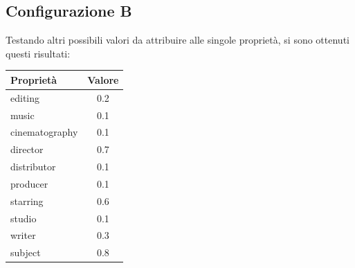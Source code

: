 \subsection{Configurazione B}
Testando altri possibili valori da attribuire alle singole proprietà, si sono ottenuti questi risultati:
\begin{table}[H]
	\small
	\centering
	\begin{tabular}{l c}
		Proprietà & Valore \\\hline
		editing & 0.2 \\
		music & 0.1 \\
		cinematography & 0.1 \\
		director & 0.7 \\
		distributor & 0.1 \\
		producer & 0.1 \\
		starring & 0.6 \\
		studio & 0.1 \\
		writer & 0.3 \\
		subject & 0.8 \\
	\end{tabular}
\end{table}


